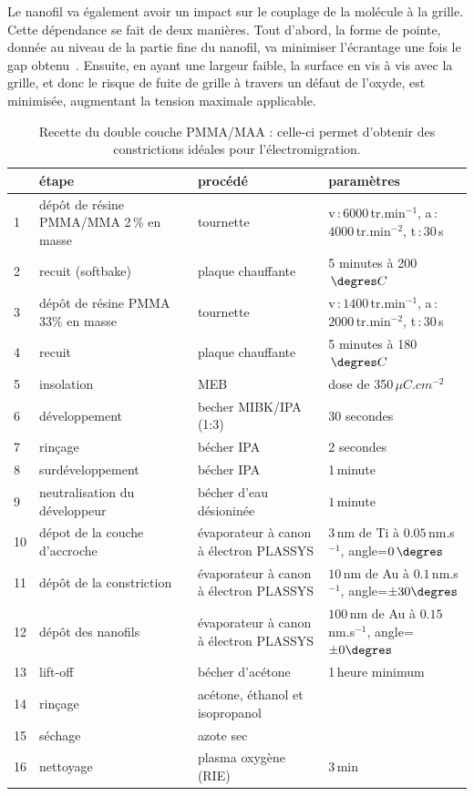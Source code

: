 Le nanofil va également avoir un impact sur le couplage de la molécule à la grille. Cette dépendance se fait de deux manières. Tout d'abord, la forme de pointe, donnée au niveau de la partie fine du nanofil, va minimiser l'écrantage une fois le gap obtenu~\cite{Datta2009}. Ensuite, en ayant une largeur faible, la surface en vis à vis avec la grille, et donc le risque de fuite de grille à travers un défaut de l'oxyde, est minimisée, augmentant la tension maximale applicable.

\begin{table}
\begin{center}
\begin{tabular}{|p{0.5cm}|p{4cm}|p{4cm}|p{3cm}|}
  \hline
\,& \textbf{étape} & \textbf{procédé} & \textbf{paramètres} \tabularnewline
\hline
1 &  dép\^ot de résine PMMA/MMA 2\,\% en masse & tournette & v\,:\,$6000\,$tr.min$^{-1}$, a\,:\,$4000\,$tr.min$^{-2}$, t\,:\,$30\,$s 
\tabularnewline
\hline
 2 & recuit (softbake) & plaque chauffante  & 5 minutes à 200$\, \degres C$ 
\tabularnewline
\hline
 3 & dépôt de résine PMMA 33\% en masse & tournette & v\,:\,$1400\,$tr.min$^{-1}$, a\,:\,$2000\,$tr.min$^{-2}$, t\,:\,$30\,$s \tabularnewline
\hline
4 & recuit & plaque chauffante & 5 minutes à 180$\, \degres C$
\tabularnewline
\hline
5 & insolation & MEB & dose de 350\,$\mu C.cm^{-2}$
\tabularnewline
\hline
6 & développement & becher MIBK/IPA (1:3) & 30 secondes
\tabularnewline
\hline
7 & rinçage & bécher IPA & 2 secondes
\tabularnewline
\hline
8 & surdéveloppement & bécher IPA & 1\,minute
\tabularnewline
\hline
9 & neutralisation du développeur &bécher d'eau désioninée & $1\,$minute\tabularnewline
\hline
10 & dépot de la couche d'accroche & évaporateur à canon à électron PLASSYS & $3\,$nm de Ti à $0.05\,$nm.s$^{-1}$, angle=$0\,\degres$
\tabularnewline
\hline
11 & dépôt de la constriction & évaporateur à canon à électron PLASSYS & $10\,$nm de Au à $0.1\,$nm.s$^{-1}$, angle=$\pm 30\degres$
\tabularnewline
\hline
12 &  dépôt des nanofils &  évaporateur à canon à électron PLASSYS  &  $100\,$nm de Au à $0.15\,$nm.s$^{-1}$, angle=$\pm 0\degres$
\tabularnewline
\hline
 13 & lift-off & bécher d'acétone & 1\,heure minimum 
\tabularnewline
\hline
14 & rinçage & acétone, éthanol et isopropanol & 
\tabularnewline
\hline
15 & séchage & azote sec & 
\tabularnewline
\hline
16 & nettoyage & plasma oxygène (RIE)& $3\,$min\tabularnewline
\hline
\end{tabular}
\caption{Recette du double couche PMMA/MAA : celle-ci permet d'obtenir des constrictions idéales pour l'électromigration.}
\label{tab_recette_elec}
\end{center}
\end{table}


